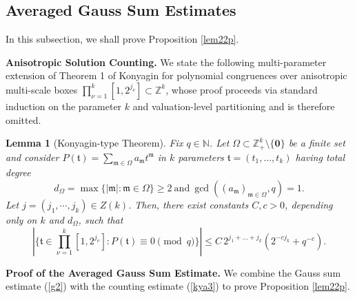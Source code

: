 \documentclass[11 pt,letterpaper]{amsart}
\theoremstyle{plain}
\newtheorem{lemma}{Lemma}\numberwithin{lemma}{section}
\theoremstyle{definition}
\theoremstyle{remark} \theoremstyle{exam} \theoremstyle{ob}
\numberwithin{equation}{section}
\begin{document}
\subsection{Averaged Gauss Sum Estimates} \label{ag}
In this subsection, we shall prove Proposition \ref{lem22p}.

\noindent\textbf{Anisotropic Solution Counting.}
We state the following multi-parameter extension of   Theorem 1 of Konyagin \cite{Kon} for polynomial congruences over
anisotropic multi-scale boxes
$
\prod_{\nu=1}^k [1,2^{j_\nu}] \subset \mathbb{Z}^k
$,
whose proof proceeds via standard induction on the parameter $k$ and valuation-level partitioning and is therefore omitted.  
\begin{lemma}[Konyagin-type Theorem]\label{mkl1}
Fix $q\in \mathbb{N}$.	Let $\Omega \subset \mathbb{Z}_+^k \setminus \{\mathbf{0}\}$ be a finite set  and consider $P(\mathfrak{t})=\sum_{\mathfrak{m}\in \Omega} a_{\mathfrak{m}}t^{\mathfrak{m}}$ in $k$ parameters $\mathfrak{t} = (t_1, \dots, t_k)$ having total degree $$d_{\Omega} = \max\{|\mathfrak{m}| : \mathfrak{m} \in \Omega\}\ge 2\  \text{and}\ \gcd((a_{\mathfrak{m}})_{\mathfrak{m} \in \Omega}, q) = 1.$$
	Let $j=(j_1,\cdots,j_{k})\in Z(k)$.  Then, there exist  constants $C, c>0$, depending only on $k$ and $d_{\Omega}$, such that
	\begin{equation}\label{kya3}
		|\{ \mathfrak{t} \in  \prod_{\nu=1}^k [1, 2^{j_\nu}]: P(\mathfrak{t}) \equiv 0 \pmod q \}| \le C \, 2^{j_1 + \dots + j_k} (2^{-cj_k}+q^{-c}).
	\end{equation}
\end{lemma} 


 






\noindent \textbf{Proof of the Averaged  Gauss Sum Estimate.} 
We combine the Gauss sum estimate (\ref{g2}) with the counting estimate (\ref{kya3}) to prove Proposition \ref{lem22p}.
\end{document}
